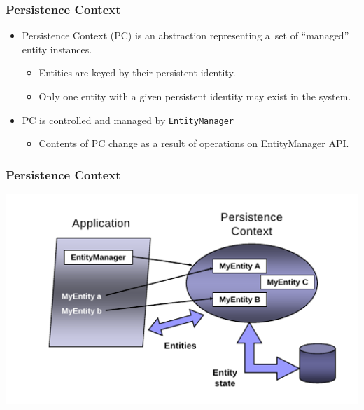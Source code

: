 \documentclass[10pt,xcolor=pdflatex]{beamer}
\begin{document}
\begin{frame}\frametitle{Persistence Context}
	\begin{itemize}
		\item Persistence Context (PC) is an abstraction representing a~set of \color{red}``managed''\color{black} entity instances.
          \begin{itemize}
        	\item Entities are keyed by their persistent identity.
        	\item Only one entity with a given persistent identity may exist in the system.
          \end{itemize}
        \medskip
		\item PC is controlled and managed by \texttt{EntityManager}
          \begin{itemize}
        	\item Contents of PC change as a result of operations on EntityManager API.
          \end{itemize}
	\end{itemize}
\end{frame}


\begin{frame}\frametitle{Persistence Context}
	\centering\includegraphics[width=0.95\paperwidth]{img/pic1.png}
\end{frame}
\end{document}
